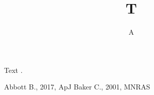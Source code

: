 \documentclass[usenatbib]{mnras}
\begin{document}
\title{T}\author{A}\maketitle
Text \citet{a}.
\begin{thebibliography}{}
 Abbott B., 2017, ApJ
 Baker C., 2001, MNRAS
\end{thebibliography}
\end{document}
